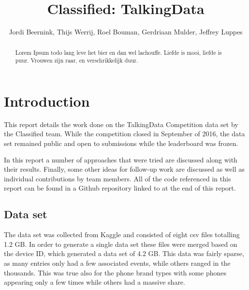 \documentclass[runningheads,a4paper]{llncs}
\begin{document}
\mainmatter 

\title{Classified: TalkingData}


\author{Jordi Beernink, Thijs Werrij, Roel Bouman, Gerdriaan Mulder, Jeffrey Luppes}



\tocauthor{{}}

\maketitle

\begin{abstract}
Lorem Ipsum todo lang leve het bier en dan wel lachouffe. Liefde is mooi, liefde is puur. Vrouwen zijn raar, en verschrikkelijk duur. 
\end{abstract}

\medskip

\begingroup
\let\clearpage\relax
\tableofcontents
{}
\endgroup

\medskip
\medskip

\section{Introduction}
This report details the work done on the TalkingData Competition data set by the Classified team. While the competition closed in September of 2016,  the data set remained public and open to submissions while the leaderboard was frozen.

In this report a number of approaches that were tried are discussed along with their results. Finally, some other ideas for follow-up work are discussed as well as individual contributions by team members. All of the code referenced in this report can be found in a Github repository linked to at the end of this report. 

\subsection{Data set}
The data set was collected from Kaggle and consisted of eight csv files totalling 1.2 GB. In order to generate a single data set these files were merged based on the device ID, which generated a data set of 4.2 GB. This data was fairly sparse, as many entries only had a few associated events, while others ranged in the thousands. This was true also for the phone brand types with some phones appearing only a few times while others had a massive share. 
\medskip
\end{document}
